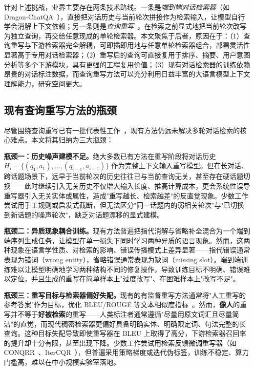 针对上述挑战，业界主要存在两条技术路线。一条是\textit{端到端对话检索器}（如 Dragon-ChatQA~\citep{Liu2024ChatQASG}），直接把对话历史与当前轮次拼接作为检索输入，让模型自行学会消解上下文依赖；另一条则是\textit{查询重写}~\citep{elgohary2019canyouunpack,vakulenko2021question,mao2023llm4cs}，在检索之前显式地把当前轮次改写为独立查询，再交给任意现成的单轮检索器。本文聚焦于后者，原因在于：（1）查询重写与下游检索器完全解耦，可即插即用地与任意单轮检索器组合，部署灵活性显著高于专用对话检索器；（2）重写后的查询可直接复用于排序、摘要、用户意图分析等多个下游模块，具有更强的工程复用价值；（3）现有对话检索器的训练依赖昂贵的对话标注数据，而查询重写方法可以充分利用日益丰富的大语言模型上下文理解能力，研究空间更大。

\subsection{现有查询重写方法的瓶颈}

尽管围绕查询重写已有一批代表性工作~\citep{voskarides2020quretec,yu2020fewshotgenerative,wu2022conqrr,mao2023llm4cs,mo2023convgqr,jang2024itercqr}，现有方法仍远未解决多轮对话检索的核心难点。本文将其归纳为三大瓶颈：

\textbf{瓶颈一：历史噪声建模不足。}绝大多数已有方法在重写阶段将对话历史 $H_i=\{(q_1,a_1),\dots,(q_{i-1},a_{i-1})\}$ 作为完整上下文输入重写模型。但在长对话、跨话题场景下，远早于当前轮次的历史往往已与当前查询无关，甚至存在硬话题切换——此时继续引入无关历史不仅增大输入长度、推高计算成本，更会系统性误导重写器引入无关实体或属性，造成"重写越长、检索越差"的反直觉现象。少数工作尝试用手工规则或启发式截断，但无法区分"同一话题内的弱相关轮次"与"已切换到新话题的噪声轮次"，缺乏对话题漂移的显式建模。

\textbf{瓶颈二：异质现象耦合训练。}现有方法普遍把指代消解与省略补全混合为一个端到端序列生成任务，让模型在单一损失下同时学习两种异质的语言现象。然而，这两种现象在语言学性质、对检索的影响、错误传播模式上差异显著——指代错误通常表现为错词（wrong entity），省略错误通常表现为缺词（missing slot）。端到端训练难以让模型明确地学习两种结构不同的修复操作，导致训练目标不明确、错误难以定位，并且生成的重写在简单样本上"过度改写"、在困难样本上"改写不足"。

\textbf{瓶颈三：重写目标与检索器偏好失配。}现有的有监督重写方法通常将"人工重写的参考答案"作为目标，优化 BLEU/ROUGE 等文本相似度指标~\citep{papineni2002bleu,lin2004rouge}。然而，\textbf{像人}的重写并不等于\textbf{好被检索}的重写——人类标注者通常遵循"尽量用原文词汇且尽量简洁"的直觉，而现代稠密检索器更偏好具备明确实体、明确限定词、句法完整的长查询。这种目标失配导致即使重写器在 BLEU 上取得了高分，下游检索器召回率的提升却十分有限，甚至出现下降。少数工作尝试用检索反馈微调重写器（如 CONQRR~\citep{wu2022conqrr}、IterCQR~\citep{jang2024itercqr}），但普遍采用策略梯度或迭代伪标签，训练不稳定、算力门槛高，难以在中小规模实验室落地。

